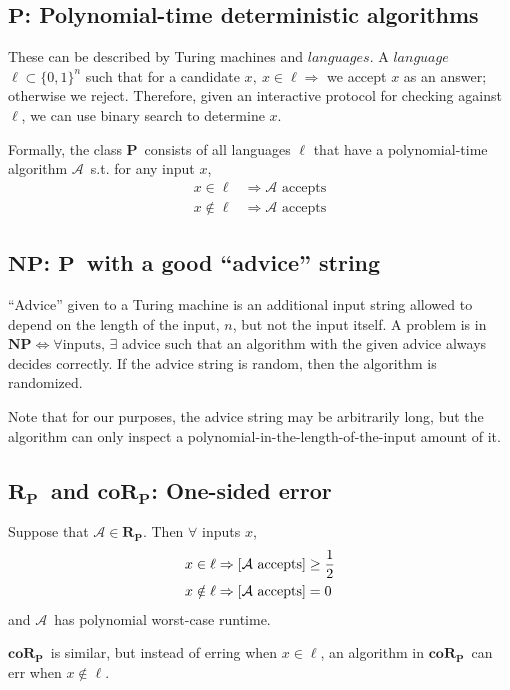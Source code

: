 \documentclass[11pt]{article}
\let\Pr\relax
\DeclareMathOperator*{\Pr}{\mathbb{P}}
\newcommand{\Pt}{\ensuremath{\mathbf{P}}}
\newcommand{\NP}{\ensuremath{\mathbf{NP}}}
\newcommand{\RP}{\ensuremath{\mathbf{R_{P}}}}
\newcommand{\coRP}{\ensuremath{\mathbf{coR_{P}}}}
\newcommand{\Alg}{\ensuremath{\mathcal{A}}}
\begin{document}
\subsection{\Pt: Polynomial-time deterministic algorithms}

These can be described by Turing machines and $languages$. A $language$ $\ell \subset \{0,1\}^n$ such that for a candidate $x,\ x \in \ell \Rightarrow$ we accept $x$ as an answer; otherwise we reject.
Therefore, given an interactive protocol for checking against $\ell$, we can use binary search to determine $x$.

Formally, the class \Pt\ consists of all languages $\ell$ that have a polynomial-time algorithm \Alg\ s.t. for any input $x$, 
\begin{align*}
  x \in \ell &\Rightarrow \Alg \text{ accepts} \\
  x \notin \ell &\Rightarrow \Alg \text{ accepts}
\end{align*}

\subsection{\NP: \Pt\ with a good ``advice'' string}

``Advice'' given to a Turing machine is an additional input string allowed to depend on the length of the input, $n$, but not the input itself. A problem is in $\NP \Leftrightarrow \forall\text{inputs, }\exists$ advice such that an algorithm with the given advice always decides correctly. If the advice string is random, then the algorithm is randomized.

Note that for our purposes, the advice string may be arbitrarily long, but the algorithm can only inspect a polynomial-in-the-length-of-the-input amount of it.

\subsection{\RP\ and \coRP: One-sided error }

Suppose that $\Alg\in\RP$. Then $\forall$ inputs $x$,
\begin{align*}
  x \in \ell &\Rightarrow \Pr[\Alg \text{ accepts}] \geq \frac{1}{2} \\
  x \notin \ell &\Rightarrow \Pr[\Alg \text{ accepts}] = 0
\end{align*}
and \Alg\ has polynomial worst-case runtime.

\coRP\ is similar, but instead of erring when $x\in\ell$, an algorithm in \coRP\ can err when $x\notin\ell$.
\end{document}

